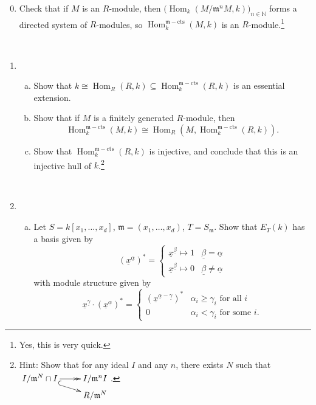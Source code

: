 \documentclass[11pt]{book}
\numberwithin{equation}{section}
\numberwithin{theorem}{chapter}
\theoremstyle{definition}
\newtheorem*{basic properties}{Basic Properties}
\newtheorem*{Important Remark}{Important Remark}
\theoremstyle{remark}
\newcommand{\NN}{\mathbb{N}}
\newcommand{\m}{\mathfrak{m}}
\newcommand{\Hom}{\operatorname{Hom}}
\begin{document}
\begin{enumerate}[1)]\setcounter{enumi}{-1}
	
	\item Check that if $M$ is an $R$-module, then $\big(\Hom_k(M/\m^n M,k)\big)_{n\in \NN}$ forms a directed system of $R$-modules, so $\Hom_k^{\m-\textrm{cts}} ( M, k)$ is an $R$-module.\footnote{Yes, this is very quick.}
	
	\
	
	\item \begin{enumerate}[a)]
		\item Show that $k \cong \Hom_R(R,k) \subseteq \Hom_k^{\m-\textrm{cts}} \left( R, k \right)$ is an essential extension.
		
		
		\item Show that if $M$ is a finitely generated $R$-module, then
		$$\Hom_k^{\m-\textrm{cts}} \left( M, k \right) \cong \Hom_R \left( M,\Hom_k^{\m-\textrm{cts}} \left( R, k \right) \right).$$
		
		
		
		\item Show that $\Hom_k^{\m-\textrm{cts}} \left( R, k \right)$ is injective, and conclude that this is an injective hull of $k$.\footnote{Hint: Show that for any ideal $I$ and any $n$, there exists $N$ such that $\xymatrix@R=1mm{I / \m^N \cap I \ar@{->>}[r] \ar@{^{(}->}[rd] & I / \m^n I \\ & R/\m^N}$.}
	\end{enumerate}
	
	\
	
	\item \begin{enumerate}[a)]
		\item Let $S = k \left[ x_1, \ldots, x_d \right]$, $\m = \left( x_1, \ldots, x_d \right)$, $T = S_\m$. Show that $E_T(k)$ has a basis given by
		$$\left( {\underline{x}}^{\underline{\alpha}} \right)^* = \left\lbrace \begin{array}{ll} {\underline{x}}^{\underline{\beta}} \mapsto 1 & {\underline{\beta}} = \underline{\alpha} \\ {\underline{x}}^{\underline{\beta}} \mapsto 0 & \underline{\beta} \neq \underline{\alpha} \end{array} \right.$$
		with module structure given by
		$${\underline{x}}^{\underline{\gamma}} \cdot \left( {\underline{x}}^{\underline{\alpha}} \right)^* = \left\lbrace \begin{array}{ll} \left( {\underline{x}}^{\underline{\alpha} - \underline{\gamma}} \right)^* & \alpha_i \geqslant \gamma_i \textrm{ for all } i \\ 0 & \alpha_i < \gamma_i \textrm{ for some } i. \end{array} \right.$$
		

\end{enumerate}
\end{enumerate}
\end{document}
